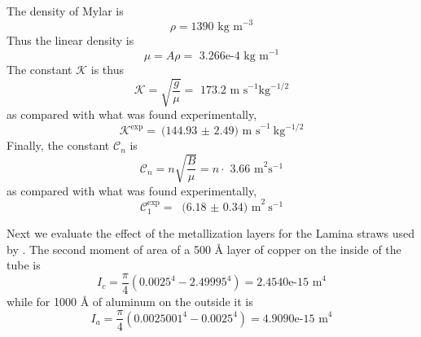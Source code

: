 \documentclass[twoside]{article}
\begin{document}
\begin{multicols}{2}
The density of Mylar is
\begin{equation}
\rho = \text{1390 kg m}^{-3}
\end{equation}
Thus the linear density is
\begin{equation}
\mu = A \rho = \text{   3.266e-4  kg m}^{-1}
\end{equation}
The constant $\mathcal{K}$ is thus
\begin{equation}
\boxed{
	\mathcal{K} = \sqrt{\frac{g}{\mu}} = \text{ 173.2   m s}^{-1} \text{kg}^{-1/2}
}
\end{equation}  
as compared with what was found experimentally, 
\begin{equation}
\mathcal{K}^\text{exp}  = \text{(144.93 $\pm$ 2.49) m s}^{-1} \text{kg}^{-1/2}
\end{equation}
Finally, the constant $\mathcal{C}_n$ is
\begin{equation}
\boxed{
\mathcal{C}_n =  n \sqrt{\frac{B}{\mu}} = n\cdot\text{ 3.66  m}^{2} \text{s}^{-1}
}
\end{equation} 
as compared with what was found experimentally,
\begin{equation}
	\mathcal{C}^\text{exp}_1 = \text{ (6.18 $\pm$ 0.34)  m}^{2} \text{s}^{-1}
\end{equation} 


Next we evaluate the effect of the metallization layers for the Lamina straws used by \cite{david}. The second moment of area of a 500 \r{A} layer of copper on the inside of the tube is
\begin{equation}
	I_c = \frac{\pi}{4}(0.0025^4 - 2.49995^4) = 2.4540\text{e-15 m}^4 
\end{equation}
while for 1000 \r{A} of aluminum on the outside it is
\begin{equation}
I_a = \frac{\pi}{4}( 0.0025001^4 - 0.0025^4) = 4.9090\text{e-15 m}^4 
\end{equation}


\end{multicols}
\end{document}
